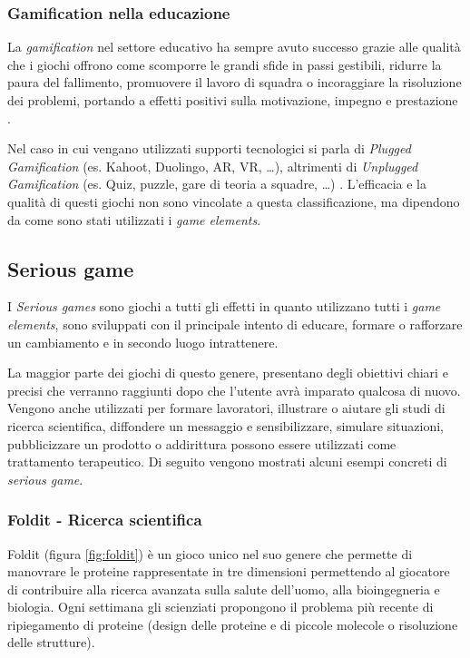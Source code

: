 \subsubsection{Gamification nella educazione}
La \textit{gamification} nel settore educativo ha sempre avuto successo grazie alle qualità che i giochi offrono come scomporre le grandi sfide in passi gestibili, ridurre la paura del fallimento, promuovere il lavoro di squadra o incoraggiare la risoluzione dei problemi, portando a effetti positivi sulla motivazione, impegno e prestazione \cite{gamifEducation}.

Nel caso in cui vengano utilizzati supporti tecnologici si parla di \textit{Plugged Gamification} (es. Kahoot, Duolingo, AR, VR, \dots), altrimenti di \textit{Unplugged Gamification} (es. Quiz, puzzle, gare di teoria a squadre, \dots) \cite{gamificInEducation}. L'efficacia e la qualità di questi giochi non sono vincolate a questa classificazione, ma dipendono da come sono stati utilizzati i \textit{game elements}.

%
%
\subsection{Serious game}
I \textit{Serious games} sono giochi a tutti gli effetti in quanto utilizzano tutti i \textit{game elements}, sono sviluppati con il principale intento di educare, formare o rafforzare un cambiamento e in secondo luogo intrattenere.

La maggior parte dei giochi di questo genere, presentano degli obiettivi chiari e precisi che verranno raggiunti dopo che l'utente avrà imparato qualcosa di nuovo.
Vengono anche utilizzati per formare lavoratori, illustrare o aiutare gli studi di ricerca scientifica, diffondere un messaggio e sensibilizzare, simulare situazioni, pubblicizzare un prodotto o addirittura possono essere utilizzati come trattamento terapeutico.
Di seguito vengono mostrati alcuni esempi concreti di \textit{serious game}.

\subsubsection{Foldit - Ricerca scientifica}
Foldit \cite{foldit} (figura \ref{fig:foldit}) è un gioco unico nel suo genere che permette di manovrare le proteine rappresentate in tre dimensioni permettendo al giocatore di contribuire alla ricerca avanzata sulla salute dell'uomo, alla bioingegneria e biologia. Ogni settimana gli scienziati propongono il problema più recente di ripiegamento di proteine (design delle proteine e di piccole molecole o risoluzione delle strutture).

